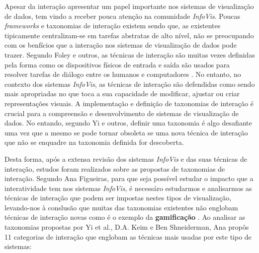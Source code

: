 Apesar da interação apresentar um papel importante nos sistemas de visualização de dados, tem vindo a receber pouca atenção na comunidade \textit{InfoVis}. Poucas \textit{frameworks} e taxonomias de interação existem sendo que, as existentes tipicamente centralizam-se em tarefas abstratas de alto nível, não se preocupando com os benfícios que a interação nos sistemas de visualização de dados pode trazer. Segundo Foley e outros, as técnicas de interação são muitas vezes definidas pela forma como os dispositivos físicos de entrada e saída são usados para resolver tarefas de diálogo entre os humanos e computadores \cite{foley1996computer}. No entanto, no contexto dos sistemas \textit{InfoVis}, as técnicas de interação são defendidas como sendo mais apropriadas no que toca a sua capacidade de modificar, ajustar ou criar representações visuais. A implementação e definição de taxonomias de interação é crucial para a compreensão e desenvolvimento de sistemas de visualização de dados. No entando, segundo Yi e outros, definir uma taxonomia é algo desafiante uma vez que a mesmo se pode tornar obsoleta se uma nova técnica de interação que não se enquadre na taxonomia definida for descoberta.

Desta forma, após a extensa revisão dos sistemas \textit{InfoVis} e das suas técnicas de interação, estudos foram realizados sobre as propostas de taxonomias de interação. Segundo Ana Figueiras, para que seja possível estudar o impacto que a interatividade tem nos sistemas \textit{InfoVis}, é necessáro estudarmos e analisarmos as técnicas de interação que podem ser impostas nestes tipos de visualização, levando-nos à conslusão que muitas das taxonomias existentes não englobam técnicas de interação novas como é o exemplo da \textbf{gamificação} \cite{figueiras2015towards}. Ao analisar as taxonomias propostas por Yi et al., D.A. Keim  e Ben Shneiderman, Ana propôs 11 categorias de interação que englobam as técnicas mais usadas por este tipo de sistemas:


